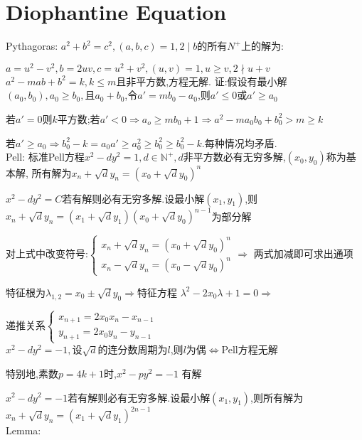 \section{Diophantine Equation} 
Pythagoras: $ a^2+b^2=c^2,(a,b,c)=1,2\mid b$的所有$ N^{+}$上的解为:

$ a=u^2-v^2,b=2uv,c=u^2+v^2,(u,v)=1,u\ge v,2 \nmid u+v$
\\

$ a^2-mab+b^2=k,k\le m$且非平方数,方程无解.
证:假设有最小解$ (a_0,b_0),a_0\ge b_0,$且$ a_0+b_0$,令$ a'=mb_0-a_0$,则$ a'\le 0$或$ a' \ge a_0$

若$ a'=0$则$ k$平方数;若$ a'<0\Rightarrow a_o\ge mb_0+1\Rightarrow a^2-ma_0b_0+b_0^2>m\ge k$

若$ a'\ge a_0\Rightarrow b_0^2-k=a_0a'\ge a_0^2\ge b_0^2\ge b_0^2-k$.每种情况均矛盾.
\\

Pell:
标准Pell方程$ x^2-dy^2=1,d\in \mathbb{N^{+}},d$非平方数必有无穷多解,$ (x_0,y_0)$称为基本解,
所有解为$ x_n+\sqrt{d}y_n=(x_0+\sqrt{d}y_0)^n$

$ x^2-dy^2=C$若有解则必有无穷多解.设最小解$ (x_1,y_1)$,则$ x_n+\sqrt{d}y_n=(x_1+\sqrt{d}y_1)(x_0+\sqrt{d}y_0)^{n-1}$为部分解

对上式中改变符号:$\left\{ \begin{matrix}x_n+\sqrt{d}y_n=(x_0+\sqrt{d}y_0)^n \\ x_n-\sqrt{d}y_n=(x_0-\sqrt{d}y_0)^n    \end{matrix} \right. \Rightarrow	$
两式加减即可求出通项

特征根为$ \lambda_{1,2}=x_0\pm\sqrt{d}y_0\Rightarrow $特征方程
$ \lambda^2-2x_0\lambda+1=0\Rightarrow$ 

递推关系$ \left \{\begin{matrix} x_{n+1}=2x_0x_n-x_{n-1}\\ y_{n+1}=2x_0y_n-y_{n-1}\end{matrix}\right.$
\\

$ x^2-dy^2=-1,$设$ \sqrt{d}$的连分数周期为$ l$,则$ l$为偶$ \Leftrightarrow $Pell方程无解

特别地,素数$ p=4k+1$时,$ x^2-py^2=-1$	有解

$ x^2-dy^2=-1$若有解则必有无穷多解.设最小解$ (x_1,y_1)$,则所有解为$ x_n+\sqrt{d}y_n=(x_1+\sqrt{d}y_1)^{2n-1}$
\\

Lemma:

